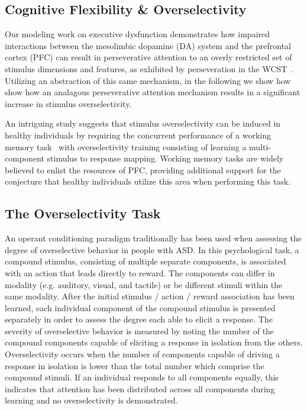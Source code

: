 \subsection{Cognitive Flexibility \& Overselectivity}
Our modeling work on executive dysfunction demonstrates how impaired interactions between the mesolimbic dopamine (DA) system and the prefrontal cortex (PFC) can result in perseverative attention to an overly restricted set of stimulus dimensions and features, as exhibited by perseveration in the WCST~\cite{KrieteT:2015:ED}.  Utilizing an abstraction of this same mechanism, in the following we show how show how an analagous perseverative attention mechanism results in a significant increase in stimulus overselectivity.   

An intriguing study suggests that stimulus overselectivity can be induced in healthy individuals by requiring the concurrent performance of a working memory task~\cite{ReedP:2005:TaskLoad} with overselectivity training consisting of learning a multi-component stimulus to response mapping.  Working memory tasks are widely believed to enlist the resources of PFC, providing additional support for the conjecture that healthy individuals utilize this area when performing this task.

\subsection{The Overselectivity Task}
An operant conditioning paradigm traditionally has been used when assessing the degree of overselective behavior in people with ASD.  In this psychological task, a compound stimulus, consisting of multiple separate components, is associated with an action that leads directly to reward.  The components can differ in modality (e.g. auditory, visual, and tactile) or be different stimuli within the same modality. After the initial stimulus / action / reward association has been learned, each individual component of the compound stimulus is presented separately in order to assess the degree each able to elicit a response.  The severity of overselective behavior is measured by noting the number of the compound components capable of eliciting a response in isolation from the others.  Overselectivity occurs when the number of components capable of driving a response in isolation is lower than the total number which comprise the compound stimuli.  If an individual responds to all components equally, this indicates that attention has been distributed across all components during learning and no overselectivity is demonstrated.   

